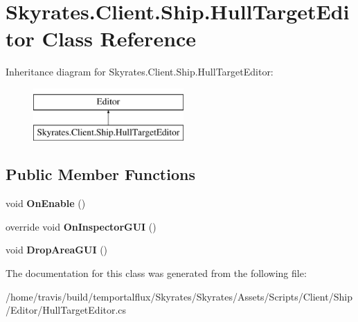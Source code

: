 \hypertarget{class_skyrates_1_1_client_1_1_ship_1_1_hull_target_editor}{\section{Skyrates.\-Client.\-Ship.\-Hull\-Target\-Editor Class Reference}
\label{class_skyrates_1_1_client_1_1_ship_1_1_hull_target_editor}
}
Inheritance diagram for Skyrates.\-Client.\-Ship.\-Hull\-Target\-Editor\-:\begin{figure}[H]
\begin{center}
\leavevmode
\includegraphics[height=2.000000cm]{class_skyrates_1_1_client_1_1_ship_1_1_hull_target_editor}
\end{center}
\end{figure}
\subsection*{Public Member Functions}
\begin{DoxyCompactItemize}
\item 
\hypertarget{class_skyrates_1_1_client_1_1_ship_1_1_hull_target_editor_aaf478ae170f0fd99ccd48b40cbc3eafe}{void {\bfseries On\-Enable} ()}\label{class_skyrates_1_1_client_1_1_ship_1_1_hull_target_editor_aaf478ae170f0fd99ccd48b40cbc3eafe}

\item 
\hypertarget{class_skyrates_1_1_client_1_1_ship_1_1_hull_target_editor_a861f0a4dc8adfd10b4d6ef63c98564cd}{override void {\bfseries On\-Inspector\-G\-U\-I} ()}\label{class_skyrates_1_1_client_1_1_ship_1_1_hull_target_editor_a861f0a4dc8adfd10b4d6ef63c98564cd}

\item 
\hypertarget{class_skyrates_1_1_client_1_1_ship_1_1_hull_target_editor_a2d166ac703db59055ac90b3f50a88c34}{void {\bfseries Drop\-Area\-G\-U\-I} ()}\label{class_skyrates_1_1_client_1_1_ship_1_1_hull_target_editor_a2d166ac703db59055ac90b3f50a88c34}

\end{DoxyCompactItemize}


The documentation for this class was generated from the following file\-:\begin{DoxyCompactItemize}
\item 
/home/travis/build/temportalflux/\-Skyrates/\-Skyrates/\-Assets/\-Scripts/\-Client/\-Ship/\-Editor/Hull\-Target\-Editor.\-cs\end{DoxyCompactItemize}
